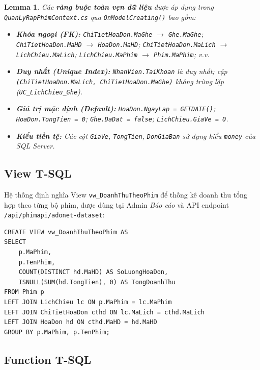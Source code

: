\documentclass[12pt,a4paper,oneside]{book}
\theoremstyle{plain}
\newtheorem{lem}[thm]{Lemma}
\numberwithin{equation}{chapter}
\begin{document}
\begin{lem}\label{lem1}
    Các \textbf{ràng buộc toàn vẹn dữ liệu} được áp dụng trong \texttt{QuanLyRapPhimContext.cs} qua \texttt{OnModelCreating()} bao gồm:
    \begin{itemize}
        \item \textbf{Khóa ngoại (FK):} \texttt{ChiTietHoaDon.MaGhe} $\to$ \texttt{Ghe.MaGhe}; \texttt{ChiTietHoaDon.MaHD} $\to$ \texttt{HoaDon.MaHD}; \texttt{ChiTietHoaDon.MaLich} $\to$ \texttt{LichChieu.MaLich}; \texttt{LichChieu.MaPhim} $\to$ \texttt{Phim.MaPhim}; v.v.
        \item \textbf{Duy nhất (Unique Index):} \texttt{NhanVien.TaiKhoan} là duy nhất; cặp \texttt{(ChiTietHoaDon.MaLich, ChiTietHoaDon.MaGhe)} không trùng lặp (\texttt{UC\_LichChieu\_Ghe}).
        \item \textbf{Giá trị mặc định (Default):} \texttt{HoaDon.NgayLap = GETDATE()}; \texttt{HoaDon.TongTien = 0}; \texttt{Ghe.DaDat = false}; \texttt{LichChieu.GiaVe = 0}.
        \item \textbf{Kiểu tiền tệ:} Các cột \texttt{GiaVe}, \texttt{TongTien}, \texttt{DonGiaBan} sử dụng kiểu \texttt{money} của SQL Server.
    \end{itemize}
\end{lem}

\vspace{0.5cm}

\subsection{View T-SQL}

\noindent Hệ thống định nghĩa View \texttt{vw\_DoanhThuTheoPhim} để thống kê doanh thu tổng hợp theo từng bộ phim, được dùng tại Admin \textit{Báo cáo} và API endpoint \texttt{/api/phimapi/adonet-dataset}:

\begin{lstlisting}[style=sqlstyle, caption={View thống kê doanh thu theo phim (\texttt{vw\_DoanhThuTheoPhim})}]
CREATE VIEW vw_DoanhThuTheoPhim AS
SELECT 
    p.MaPhim,
    p.TenPhim,
    COUNT(DISTINCT hd.MaHD) AS SoLuongHoaDon,
    ISNULL(SUM(hd.TongTien), 0) AS TongDoanhThu
FROM Phim p
LEFT JOIN LichChieu lc ON p.MaPhim = lc.MaPhim
LEFT JOIN ChiTietHoaDon cthd ON lc.MaLich = cthd.MaLich
LEFT JOIN HoaDon hd ON cthd.MaHD = hd.MaHD
GROUP BY p.MaPhim, p.TenPhim;
\end{lstlisting}

\subsection{Function T-SQL}
\end{document}
